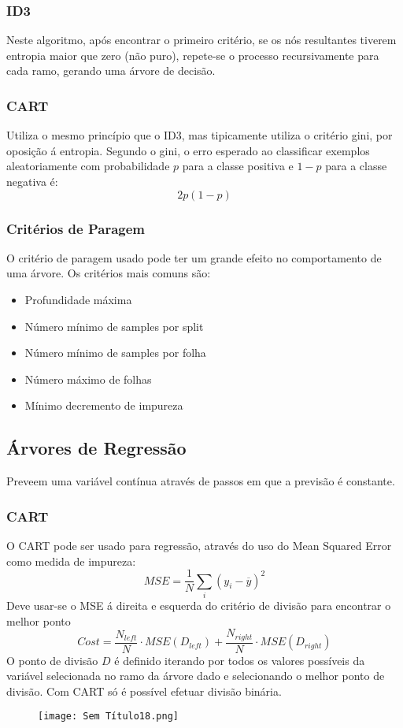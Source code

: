 \documentclass[10pt,a4paper]{report}
\begin{document}
\subsubsection{ID3}
Neste algoritmo, após encontrar o primeiro critério, se os nós resultantes tiverem entropia maior que zero (não puro), repete-se o processo recursivamente para cada ramo, gerando uma árvore de decisão.
\subsubsection{CART}
Utiliza o mesmo princípio que o ID3, mas tipicamente utiliza o critério gini, por oposição á entropia. Segundo o gini, o erro esperado ao classificar exemplos aleatoriamente com probabilidade $p$ para a classe positiva e $1 - p$ para a classe negativa é:
$$
2p(1-p)
$$ 
\subsubsection{Critérios de Paragem}
O critério de paragem usado pode ter um grande efeito no comportamento de uma árvore. Os critérios mais comuns são:
\begin{itemize}
\item Profundidade máxima
\item Número mínimo de samples por split
\item Número mínimo de samples por folha
\item Número máximo de folhas
\item Mínimo decremento de impureza
\end{itemize}
\subsection{Árvores de Regressão}
Preveem uma variável contínua através de passos em que a previsão é constante.
\subsubsection{CART}
O CART pode ser usado para regressão, através do uso do Mean Squared Error como medida de impureza:
$$
MSE = \frac{1}{N} \sum_{i} (y_i - \overline{y})^2
$$
Deve usar-se o MSE á direita e esquerda do critério de divisão para encontrar o melhor ponto
$$
Cost = \frac{N_{left}}{N} \cdot MSE(D_{left}) + \frac{N_{right}}{N} \cdot MSE(D_{right})
$$
O ponto de divisão $D$ é definido iterando por todos os valores possíveis da variável selecionada no ramo da árvore dado e selecionando o melhor ponto de divisão. Com CART só é possível efetuar divisão binária.
\begin{figure}[H]
\centering
\texttt{[image: Sem Título18.png]}
\end{figure}
\end{document}

